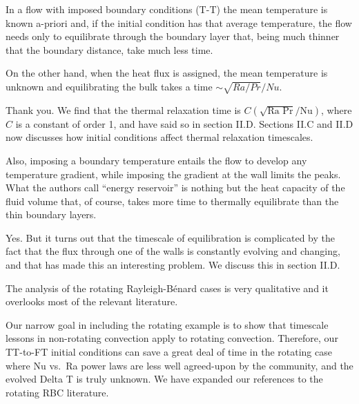 \documentclass[aps, 11pt, singlecolumn]{revtex4-1} %
\begin{document}
\begin{singlespace}
\begin{myquotation}
In a flow with imposed boundary conditions (T-T) the mean temperature is known a-priori and, if the initial condition has that average temperature, the flow needs only to equilibrate through the boundary layer that, being much thinner that the boundary distance, take much less time.

On the other hand, when the heat flux is assigned, the mean temperature is unknown and equilibrating the bulk takes a time $\sim\sqrt{Ra/Pr}/Nu$. 
\end{myquotation}
Thank you.
We find that the thermal relaxation time is $C (\sqrt{\text{Ra Pr}}/\text{Nu})$, where $C$ is a constant of order 1, and have said so in section II.D.
Sections II.C and II.D now discusses how initial conditions affect thermal relaxation timescales.

\begin{myquotation}
Also, imposing a boundary temperature entails the flow to develop any temperature gradient, while imposing the gradient at the wall limits the peaks. 
What the authors call ``energy reservoir'' is nothing but the heat capacity of the fluid volume that, of course, takes more time to thermally equilibrate than the thin boundary layers.
\end{myquotation}
Yes.
But it turns out that the timescale of equilibration is complicated by the fact that the flux through one of the walls is constantly evolving and changing, and that has made this an interesting problem.
We discuss this in section II.D.

\begin{myquotation}
The analysis of the rotating Rayleigh-B\'{e}nard cases is very qualitative and it overlooks most of the relevant literature.
\end{myquotation}
Our narrow goal in including the rotating example is to show that timescale lessons in non-rotating convection apply to rotating convection.
Therefore, our TT-to-FT initial conditions can save a great deal of time in the rotating case where Nu vs.~Ra power laws are less well agreed-upon by the community, and the evolved Delta T is truly unknown.
We have expanded our references to the rotating RBC literature.


\end{singlespace}
\end{document}

